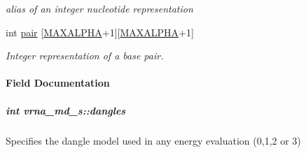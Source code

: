 \begin{DoxyCompactItemize}
\begin{DoxyCompactList}\small\item\em alias of an integer nucleotide representation \end{DoxyCompactList}\item 
\hypertarget{group__model__details_ab4da594c638707e212f64aadb54a7454}{int \hyperlink{group__model__details_ab4da594c638707e212f64aadb54a7454}{pair} \mbox{[}\hyperlink{group__model__details_ga05a5ffe718aa431d97419a12fb082379}{M\-A\-X\-A\-L\-P\-H\-A}+1\mbox{]}\mbox{[}\hyperlink{group__model__details_ga05a5ffe718aa431d97419a12fb082379}{M\-A\-X\-A\-L\-P\-H\-A}+1\mbox{]}}\label{group__model__details_ab4da594c638707e212f64aadb54a7454}

\begin{DoxyCompactList}\small\item\em Integer representation of a base pair. \end{DoxyCompactList}\end{DoxyCompactItemize}


\paragraph{Field Documentation}
\hypertarget{group__model__details_adcda4ff2ea77748ae0e8700288282efc}{
\subparagraph[{dangles}]{\setlength{\rightskip}{0pt plus 5cm}int vrna\-\_\-md\-\_\-s\-::dangles}}\label{group__model__details_adcda4ff2ea77748ae0e8700288282efc}


Specifies the dangle model used in any energy evaluation (0,1,2 or 3) 

